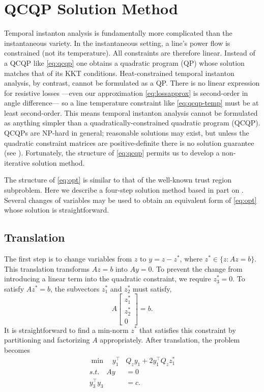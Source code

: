 \documentclass[journal,twoside]{IEEEtran}
\begin{document}
\section{QCQP Solution Method}\label{sec:solution}
Temporal instanton analysis is fundamentally more complicated than the instantaneous variety. In the instantaneous setting, a line's power flow is constrained (not its temperature). All constraints are therefore linear. Instead of a QCQP like \eqref{eq:qcqp} one obtains a quadratic program (QP) whose solution matches that of its KKT conditions. Heat-constrained temporal instanton analysis, by contrast, cannot be formulated as a QP. There is no linear expression for resistive losses ---even our approximation \eqref{eq:lossapprox} is second-order in angle difference--- so a line temperature constraint like \eqref{eq:qcqp-temp} must be at least second-order. This means temporal instanton analysis cannot be formulated as anything simpler than a quadratically-constrained quadratic program (QCQP). QCQPs are NP-hard in general; reasonable solutions may exist, but unless the quadratic constraint matrices are positive-definite there is no solution guarantee (see \cite{mehanna2014}). Fortunately, the structure of \eqref{eq:qcqp} permits us to develop a non-iterative solution method.




The structure of \eqref{eq:opt} is similar to that of the well-known trust region subproblem. Here we describe a four-step solution method based in part on \cite{bienstock2014}. Several changes of variables may be used to obtain an equivalent form of \eqref{eq:opt} whose solution is straightforward.

\subsection{Translation}\label{sec:solution-translation}
The first step is to change variables from $z$ to $y=z-z^*$, where
$z^*\in\{z:Az=b\}$. This translation transforms $Az=b$ into $Ay=0$. To
prevent the change from introducing a linear term into the quadratic
constraint, we require $z_3^*=0$. To satisfy $Az^*=b$, the subvectors
$z_1^*$ and $z_2^*$ must satisfy,
\[
A \begin{bmatrix} z_1^* \\ z_2^*
\\ 0 \end{bmatrix} = b.
\]
It is straightforward to find a min-norm $z^*$ that satisfies this
constraint by partitioning and factorizing $A$ appropriately. After
translation, the problem becomes
\begin{subequations}\label{opt2}
\begin{align}
\label{opt2:obj} \min\quad y_1^\top &Q_z y_1 + 2 y_1^\top Q_z z_1^* \\
\label{opt2:lin} s.t.\quad Ay &= 0 \\
\label{opt2:quad} y_3^\top y_3 &= c.
\end{align}
\end{subequations}
\end{document}
